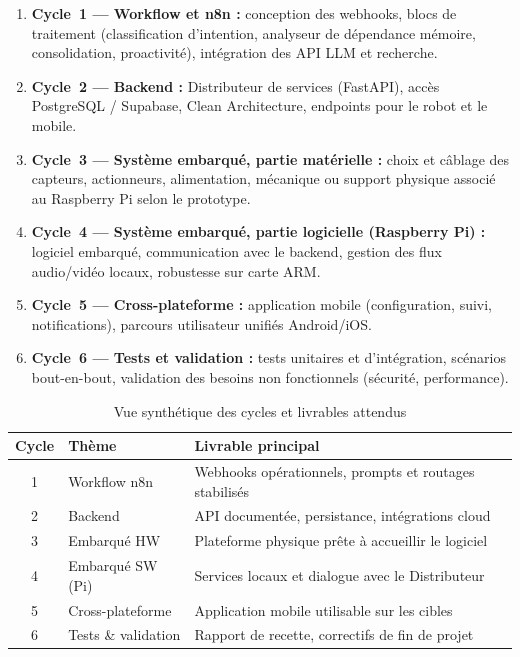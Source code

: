 \documentclass[a4paper,12pt]{report}
\begin{document}
	\begin{enumerate}
		\item \textbf{Cycle~1 — Workflow et n8n :} conception des webhooks, blocs de
		traitement (classification d'intention, analyseur de dépendance mémoire,
		consolidation, proactivité), intégration des API LLM et recherche.
		\item \textbf{Cycle~2 — Backend :} Distributeur de services (FastAPI), accès
		PostgreSQL / Supabase, Clean Architecture, endpoints pour le robot et le mobile.
		\item \textbf{Cycle~3 — Système embarqué, partie matérielle :} choix et câblage
		des capteurs, actionneurs, alimentation, mécanique ou support physique associé au
		Raspberry Pi selon le prototype.
		\item \textbf{Cycle~4 — Système embarqué, partie logicielle (Raspberry Pi) :}
		logiciel embarqué, communication avec le backend, gestion des flux audio/vidéo
		locaux, robustesse sur carte ARM.
		\item \textbf{Cycle~5 — Cross-plateforme :} application mobile (configuration,
		suivi, notifications), parcours utilisateur unifiés Android/iOS.
		\item \textbf{Cycle~6 — Tests et validation :} tests unitaires et d'intégration,
		scénarios bout-en-bout, validation des besoins non fonctionnels (sécurité,
		performance).
	\end{enumerate}
	
	\begin{table}[htbp]
		\centering
		\caption{Vue synthétique des cycles et livrables attendus}
		\label{tab:cycles_koda}
		\renewcommand{\arraystretch}{1.25}
		\begin{tabular}{|c|p{4.2cm}|p{7.5cm}|}
			\hline
			\textbf{Cycle} & \textbf{Thème} & \textbf{Livrable principal} \\
			\hline
			1 & Workflow n8n & Webhooks opérationnels, prompts et routages stabilisés \\
			\hline
			2 & Backend & API documentée, persistance, intégrations cloud \\
			\hline
			3 & Embarqué HW & Plateforme physique prête à accueillir le logiciel \\
			\hline
			4 & Embarqué SW (Pi) & Services locaux et dialogue avec le Distributeur \\
			\hline
			5 & Cross-plateforme & Application mobile utilisable sur les cibles \\
			\hline
			6 & Tests \& validation & Rapport de recette, correctifs de fin de projet \\
			\hline
		\end{tabular}
	\end{table}
	
\end{document}
